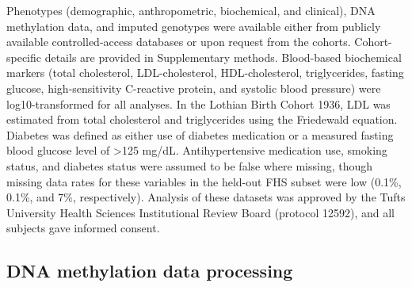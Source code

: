 \documentclass[]{article}
\begin{document}
Phenotypes (demographic, anthropometric, biochemical, and clinical), DNA
methylation data, and imputed genotypes were available either from
publicly available controlled-access databases or upon request from the
cohorts. Cohort-specific details are provided in Supplementary methods.
Blood-based biochemical markers (total cholesterol, LDL-cholesterol,
HDL-cholesterol, triglycerides, fasting glucose, high-sensitivity
C-reactive protein, and systolic blood pressure) were log10-transformed
for all analyses. In the Lothian Birth Cohort 1936, LDL was estimated
from total cholesterol and triglycerides using the Friedewald equation.
Diabetes was defined as either use of diabetes medication or a measured
fasting blood glucose level of \textgreater{}125 mg/dL. Antihypertensive
medication use, smoking status, and diabetes status were assumed to be
false where missing, though missing data rates for these variables in
the held-out FHS subset were low (0.1\%, 0.1\%, and 7\%, respectively).
Analysis of these datasets was approved by the Tufts University Health
Sciences Institutional Review Board (protocol 12592), and all subjects
gave informed consent.

\hypertarget{dna-methylation-data-processing}{%
\subsection{DNA methylation data
processing}\label{dna-methylation-data-processing}}
\end{document}
